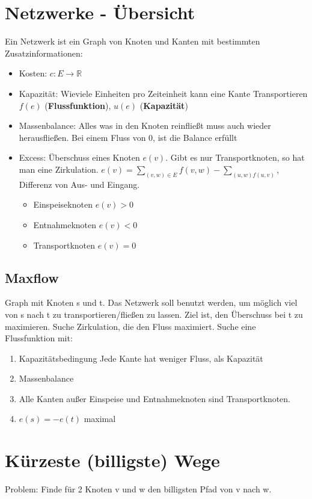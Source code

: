 \section*{Netzwerke - Übersicht}
Ein Netzwerk ist ein Graph von Knoten und Kanten mit bestimmten Zusatzinformationen:
\begin{itemize}
    \item Kosten: $c : E \rightarrow \mathbb{R}$
    \item Kapazität: Wieviele Einheiten pro Zeiteinheit kann eine Kante Transportieren $ f(e)$ (\textbf{Flussfunktion}), $u(e)$ (\textbf{Kapazität})
    \item Massenbalance: Alles was in den Knoten reinfließt muss auch wieder herausfließen. Bei einem Fluss von 0, ist die Balance erfüllt
    \item Excess: Überschuss eines Knoten $e(v)$. Gibt es nur Transportknoten, so hat man eine Zirkulation. $e(v)=\sum_{(v,w) \in E} f(v,w) - \sum_{(u,w)f(u,v)}$, Differenz von Aus- und Eingang.
    \begin{itemize}
        \item Einspeiseknoten $e(v) > 0$
        \item Entnahmeknoten $e(v) < 0$
        \item Transportknoten $e(v) = 0$
    \end{itemize}
\end{itemize}

\subsection*{Maxflow}
Graph mit Knoten s und t. Das Netzwerk soll benutzt werden, um möglich viel von s nach t zu transportieren/fließen zu lassen.
Ziel ist, den Überschuss bei t zu maximieren. Suche Zirkulation, die den Fluss maximiert. Suche eine Flussfunktion mit:
\begin{enumerate}
 \item Kapazitätsbedingung Jede Kante hat weniger Fluss, als Kapazität
 \item Massenbalance
 \item Alle Kanten außer Einspeise und Entnahmeknoten sind Transportknoten.
 \item $e(s) = -e(t)$ maximal
\end{enumerate}



\section{Kürzeste (billigste) Wege}
Problem: Finde für 2 Knoten v und w den billigsten Pfad von v nach w.
